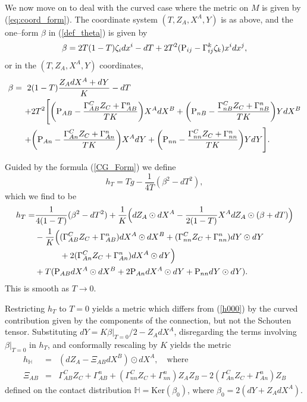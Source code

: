 We now move on to deal with the
curved case where the metric on $M$ is given by 
(\ref{eq:coord_form}).
The coordinate system $(T, Z_A, X^A, Y)$ is as above, and
the one--form $\beta$ in (\ref{def_theta}) is given by
\[
\beta=2T(1-T)\zeta_idx^i-dT+2T^2(\mathrm{P}_{ij}-\Gamma_{ij}^k\zeta_k)x^idx^j,
\]
or in the $(T, Z_A, X^A, Y)$ coordinates,
\[
\begin{split}
\beta=\ 2&(1-T)\frac{Z_AdX^A+dY}{K} - dT \\
+& 2T^2\Bigg[\bigg(\mathrm{P}_{AB}-\frac{\Gamma^C_{AB}Z_C+\Gamma^n_{AB}}{TK}\bigg)X^AdX^B 
+\bigg(\mathrm{P}_{nB}-\frac{\Gamma^C_{nB}Z_C+\Gamma^n_{nB}}{TK}\bigg)YdX^B \\
+& \bigg(\mathrm{P}_{An}-\frac{\Gamma^C_{An}Z_C+\Gamma^n_{An}}{TK}\bigg)X^AdY 
+\bigg(\mathrm{P}_{nn}-\frac{\Gamma^C_{nn}Z_C+\Gamma^n_{nn}}{TK}\bigg)YdY\Bigg].
\end{split}
\]

Guided by the formula (\ref{CG_Form}) we define
\[
h_T=Tg-\frac{1}{4T}(\beta^2-dT^2),
\]
which we find to be
\begin{equation*}
\begin{split}
h_T=&
\frac{1}{4(1-T)}(\beta^2-dT^2)+\frac{1}{K}\Big(dZ_A\odot dX^A-\frac{1}{2(1-T)}
X^A dZ_A\odot (\beta+dT)\Big)\\
&-\frac{1}{K}\Big(
(\Gamma_{AB}^CZ_C+\Gamma_{AB}^n)dX^A\odot dX^B+
(\Gamma_{nn}^CZ_C+\Gamma_{nn}^n)dY\odot dY \\
&\qquad\quad + 2(\Gamma_{An}^CZ_C+\Gamma_{An}^n)dX^A\odot dY\Big)\\
&+T(\mathrm{P}_{AB}dX^A\odot dX^B+2\mathrm{P}_{An}dX^A\odot dY+\mathrm{P}_{nn}dY\odot dY).
\end{split}
\end{equation*}
This is  smooth as $T\rightarrow 0$.

Restricting $h_T$ to $T=0$ yields a metric which differs from
(\ref{h000}) by the curved contribution given by the components of the  connection, but not the Schouten tensor. Substituting $dY=K\beta|_{T=0}/2-Z_AdX^A$, disregarding the terms involving $\beta|_{T=0}$ in $h_T$, and conformally rescaling by 
$K$ yields the metric
\begin{eqnarray}
\label{met_th}
h_{ \mathbb{H} }&=&(dZ_A-\Xi_{AB}dX^B)\odot dX^A,\quad
\mbox{where}\\
\Xi_{AB}&=&\Gamma_{AB}^CZ_C+\Gamma_{AB}^n+
(\Gamma_{nn}^CZ_C+\Gamma_{nn}^n)Z_AZ_B-
2(\Gamma_{An}^CZ_C+\Gamma_{An}^n)Z_B\nonumber
\end{eqnarray}
defined on the contact distribution ${ \mathbb{H} }=\mbox{Ker}(\beta_0)$, 
where $\beta_0=2(dY+Z_AdX^A)$.

